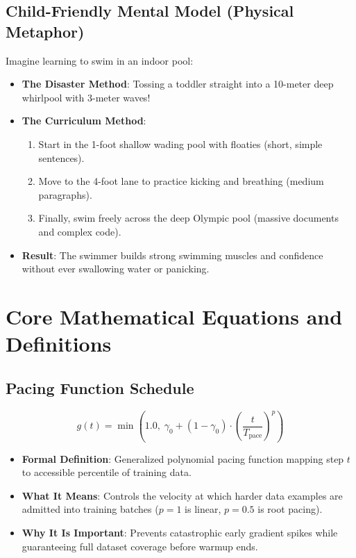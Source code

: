 \documentclass[11pt,a4paper]{article}
\theoremstyle{definition}
\begin{document}
\subsection{Child-Friendly Mental Model (Physical Metaphor)}
Imagine learning to swim in an indoor pool:
\begin{itemize}
    \item \textbf{The Disaster Method}: Tossing a toddler straight into a 10-meter deep whirlpool with 3-meter waves!
    \item \textbf{The Curriculum Method}:
    \begin{enumerate}
        \item Start in the 1-foot shallow wading pool with floaties (short, simple sentences).
        \item Move to the 4-foot lane to practice kicking and breathing (medium paragraphs).
        \item Finally, swim freely across the deep Olympic pool (massive documents and complex code).
    \end{enumerate}
    \item \textbf{Result}: The swimmer builds strong swimming muscles and confidence without ever swallowing water or panicking.
\end{itemize}

\section{Core Mathematical Equations and Definitions}

\subsection{Pacing Function Schedule}
{\boldmath
\begin{equation}
g(t) = \min\left(1.0, \; \gamma_0 + (1 - \gamma_0) \cdot \left(\frac{t}{T_{\text{pace}}}\right)^p\right)
\end{equation}
}
\begin{itemize}
    \item \textbf{Formal Definition}: Generalized polynomial pacing function mapping step $t$ to accessible percentile of training data.
    \item \textbf{What It Means}: Controls the velocity at which harder data examples are admitted into training batches ($p = 1$ is linear, $p = 0.5$ is root pacing).
    \item \textbf{Why It Is Important}: Prevents catastrophic early gradient spikes while guaranteeing full dataset coverage before warmup ends.
\end{itemize}
\end{document}
